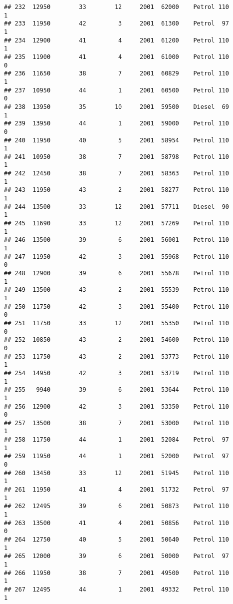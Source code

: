 \documentclass[]{article}
\begin{document}
\begin{verbatim}
## 232  12950        33        12     2001  62000    Petrol 110         1
## 233  11950        42         3     2001  61300    Petrol  97         1
## 234  12900        41         4     2001  61200    Petrol 110         1
## 235  11900        41         4     2001  61000    Petrol 110         0
## 236  11650        38         7     2001  60829    Petrol 110         1
## 237  10950        44         1     2001  60500    Petrol 110         0
## 238  13950        35        10     2001  59500    Diesel  69         1
## 239  13950        44         1     2001  59000    Petrol 110         0
## 240  11950        40         5     2001  58954    Petrol 110         1
## 241  10950        38         7     2001  58798    Petrol 110         1
## 242  12450        38         7     2001  58363    Petrol 110         1
## 243  11950        43         2     2001  58277    Petrol 110         1
## 244  13500        33        12     2001  57711    Diesel  90         1
## 245  11690        33        12     2001  57269    Petrol 110         1
## 246  13500        39         6     2001  56001    Petrol 110         1
## 247  11950        42         3     2001  55968    Petrol 110         0
## 248  12900        39         6     2001  55678    Petrol 110         1
## 249  13500        43         2     2001  55539    Petrol 110         1
## 250  11750        42         3     2001  55400    Petrol 110         0
## 251  11750        33        12     2001  55350    Petrol 110         0
## 252  10850        43         2     2001  54600    Petrol 110         0
## 253  11750        43         2     2001  53773    Petrol 110         1
## 254  14950        42         3     2001  53719    Petrol 110         1
## 255   9940        39         6     2001  53644    Petrol 110         1
## 256  12900        42         3     2001  53350    Petrol 110         0
## 257  13500        38         7     2001  53000    Petrol 110         1
## 258  11750        44         1     2001  52084    Petrol  97         1
## 259  11950        44         1     2001  52000    Petrol  97         0
## 260  13450        33        12     2001  51945    Petrol 110         1
## 261  11950        41         4     2001  51732    Petrol  97         1
## 262  12495        39         6     2001  50873    Petrol 110         1
## 263  13500        41         4     2001  50856    Petrol 110         0
## 264  12750        40         5     2001  50640    Petrol 110         1
## 265  12000        39         6     2001  50000    Petrol  97         1
## 266  11950        38         7     2001  49500    Petrol 110         1
## 267  12495        44         1     2001  49332    Petrol 110         1

\end{verbatim}
\end{document}
